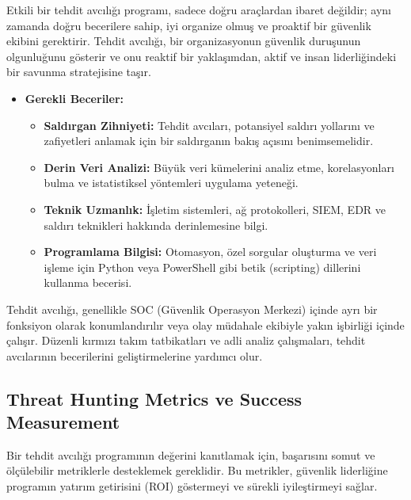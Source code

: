 Etkili bir tehdit avcılığı programı, sadece doğru araçlardan ibaret değildir; aynı zamanda doğru becerilere sahip, iyi organize olmuş ve proaktif bir güvenlik ekibini gerektirir. Tehdit avcılığı, bir organizasyonun güvenlik duruşunun olgunluğunu gösterir ve onu reaktif bir yaklaşımdan, aktif ve insan liderliğindeki bir savunma stratejisine taşır.

\begin{itemize}
    \item \textbf{Gerekli Beceriler:}
    \begin{itemize}
        \item \textbf{Saldırgan Zihniyeti:} Tehdit avcıları, potansiyel saldırı yollarını ve zafiyetleri anlamak için bir saldırganın bakış açısını benimsemelidir.
        \item \textbf{Derin Veri Analizi:} Büyük veri kümelerini analiz etme, korelasyonları bulma ve istatistiksel yöntemleri uygulama yeteneği.
        \item \textbf{Teknik Uzmanlık:} İşletim sistemleri, ağ protokolleri, SIEM, EDR ve saldırı teknikleri hakkında derinlemesine bilgi.
        \item \textbf{Programlama Bilgisi:} Otomasyon, özel sorgular oluşturma ve veri işleme için Python veya PowerShell gibi betik (scripting) dillerini kullanma becerisi.
    \end{itemize}
\end{itemize}

Tehdit avcılığı, genellikle SOC (Güvenlik Operasyon Merkezi) içinde ayrı bir fonksiyon olarak konumlandırılır veya olay müdahale ekibiyle yakın işbirliği içinde çalışır. Düzenli kırmızı takım tatbikatları ve adli analiz çalışmaları, tehdit avcılarının becerilerini geliştirmelerine yardımcı olur.

\subsection{Threat Hunting Metrics ve Success Measurement}

Bir tehdit avcılığı programının değerini kanıtlamak için, başarısını somut ve ölçülebilir metriklerle desteklemek gereklidir. Bu metrikler, güvenlik liderliğine programın yatırım getirisini (ROI) göstermeyi ve sürekli iyileştirmeyi sağlar.

